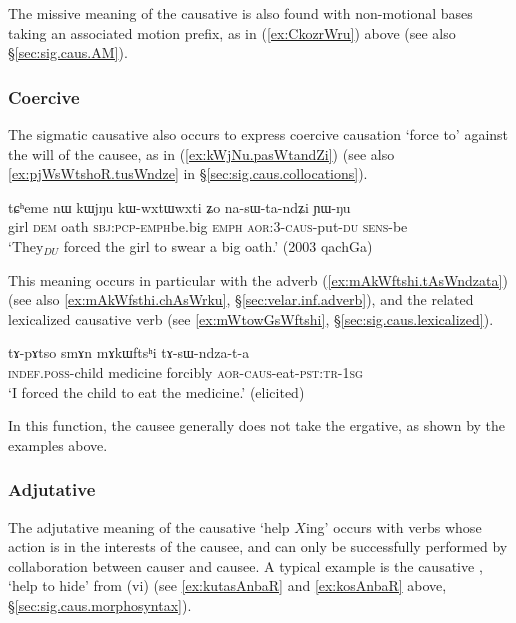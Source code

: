 The missive meaning of the causative is also found with non-motional bases taking an associated motion prefix, as in (\ref{ex:CkozrWru}) above (see also §\ref{sec:sig.caus.AM}).

\subsubsection{Coercive} \label{sec:sig.caus.coercitive}
The sigmatic causative also occurs to express coercive causation `force to' against the will of the causee, as in (\ref{ex:kWjNu.pasWtandZi}) (see also \ref{ex:pjWsWtshoR.tusWndze} in §\ref{sec:sig.caus.collocations}).

\begin{exe}
\ex \label{ex:kWjNu.pasWtandZi}
\gll tɕʰeme nɯ kɯjŋu kɯ-wxtɯ\redp{}wxti ʑo na-sɯ-ta-ndʑi ɲɯ-ŋu \\
girl \textsc{dem} oath \textsc{sbj}:\textsc{pcp}-\textsc{emph}\redp{}be.big \textsc{emph} \textsc{aor}:3\flobv{}-\textsc{caus}-put-\textsc{du} \textsc{sens}-be \\
\glt `They$_{DU}$ forced the girl to swear a big oath.' (2003 qachGa)
\end{exe}

This meaning occurs in particular with the adverb  (\ref{ex:mAkWftshi.tAsWndzata}) (see also \ref{ex:mAkWfsthi.chAsWrku}, §\ref{sec:velar.inf.adverb}), and the related lexicalized causative verb  (see \ref{ex:mWtowGsWftshi}, §\ref{sec:sig.caus.lexicalized}).

\begin{exe}
\ex \label{ex:mAkWftshi.tAsWndzata}
\gll  tɤ-pɤtso smɤn mɤkɯftsʰi tɤ-sɯ-ndza-t-a \\
\textsc{indef}.\textsc{poss}-child medicine forcibly \textsc{aor}-\textsc{caus}-eat-\textsc{pst}:\textsc{tr}-\textsc{1sg} \\
\glt `I forced the child to eat the medicine.' (elicited)
\end{exe}

In this function, the causee generally does not take the ergative, as shown by the examples above.


\subsubsection{Adjutative} \label{sec:sig.caus.adjutative}
The adjutative meaning of the causative `help $X$ing' occurs with verbs whose action is in the interests of the causee, and can only be successfully performed by collaboration between causer and causee. A typical example is the causative , `help to hide' from  (vi) (see \ref{ex:kutasAnbaR} and \ref{ex:kosAnbaR} above, §\ref{sec:sig.caus.morphosyntax}).

